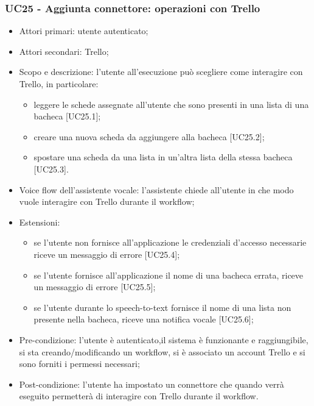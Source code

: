 \subsubsection{UC25 - Aggiunta connettore: operazioni con Trello}
\begin{itemize}
	\item  Attori primari: utente autenticato;
     \item  Attori secondari: Trello;
	\item  Scopo e descrizione: l'utente all'esecuzione può scegliere come interagire con Trello, in particolare:
		   \begin{itemize}
				\item leggere le schede assegnate all'utente che sono presenti in una lista di una bacheca [UC25.1];
				\item creare una nuova scheda da aggiungere alla bacheca [UC25.2];
				\item spostare una scheda da una lista in un'altra lista della stessa bacheca [UC25.3].
		   \end{itemize}
	\item  Voice flow dell'assistente vocale: l'assistente chiede all'utente in che modo vuole interagire con Trello durante il workflow;
	\item  Estensioni: 
		   \begin{itemize}
				\item se l'utente non fornisce all'applicazione le credenziali d'accesso necessarie riceve un messaggio di errore [UC25.4];
				\item se l'utente fornisce all'applicazione il nome di una bacheca errata, riceve un messaggio di errore [UC25.5];
				\item se l'utente durante lo speech-to-text fornisce il nome di una lista non presente nella bacheca, riceve una notifica vocale [UC25.6];
		   \end{itemize}
	\item  Pre-condizione: l'utente è autenticato,il sistema è funzionante e raggiungibile, si sta creando/modificando un workflow, si è associato un account Trello e si sono forniti i permessi necessari;
	\item  Post-condizione: l'utente ha impostato un connettore che quando verrà eseguito permetterà di interagire con Trello durante il workflow.
\end{itemize}
